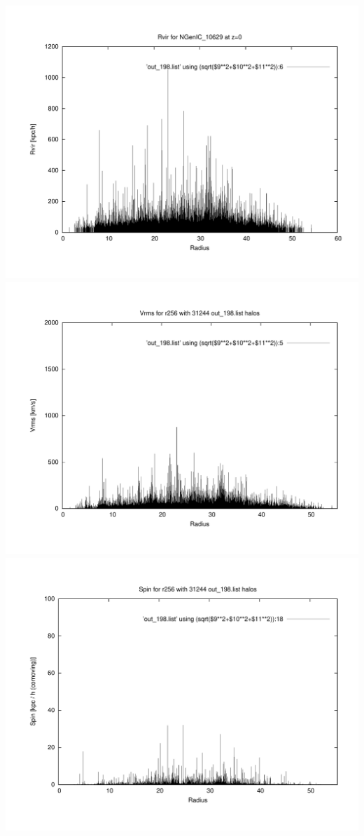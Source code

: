 \includegraphics[scale=0.3]{r256/h100/NGenIC_10629/plot_rvir_z0.pdf}
\includegraphics[scale=0.3]{r256/h100/NGenIC_10629/plot_Vrms_out_198.pdf}
\includegraphics[scale=0.3]{r256/h100/NGenIC_10629/plot_spin_out_198.pdf}

